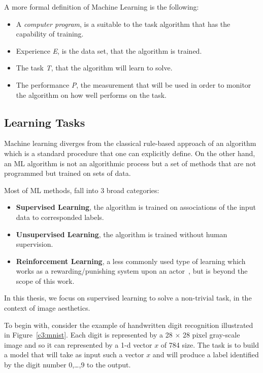 A more formal definition of Machine Learning is the following:
\begin{itemize}
 \item A \textit{computer program}, is a suitable to the task algorithm that has the capability of training.
 \item Experience \textit{E}, is the data set, that the algorithm is trained.
 \item The task \textit{T}, that the algorithm will learn to solve.
 \item The performance \textit{P}, the measurement that will be used in order to monitor the algorithm on how well performs on the task.
\end{itemize}


\subsection{Learning Tasks}

Machine learning diverges from the classical rule-based approach of an algorithm which is a standard procedure that one can explicitly define. On the other hand, an ML algorithm is not an algorithmic process but a set of methods that are not programmed but trained on sets of data.

Most of ML methods, fall into 3 broad categories:
\begin{itemize}
 \item \textbf{Supervised Learning}, the algorithm is trained on associations of the input data to  corresponded labels.
 \item \textbf{Unsupervised Learning}, the algorithm is trained without human supervision.
 \item \textbf{Reinforcement Learning}, a less commonly used type of learning which works as a rewarding/punishing system upon an actor~\cite{sutton2018reinforcement}, but is beyond the scope of this work.
\end{itemize}

In this thesis, we focus on supervised learning to solve a non-trivial task, in the context of image aesthetics.

To begin with, consider the example of handwritten digit recognition illustrated in Figure~\ref{c3:mnist}. Each digit is represented by a 28 $\times$ 28 pixel gray-scale image and so it can represented by a 1-d vector $x$ of 784 size. The task is to build a model that will take as input such a vector $x$ and will produce a label identified by the digit number 0,\dots,9 to the output.

